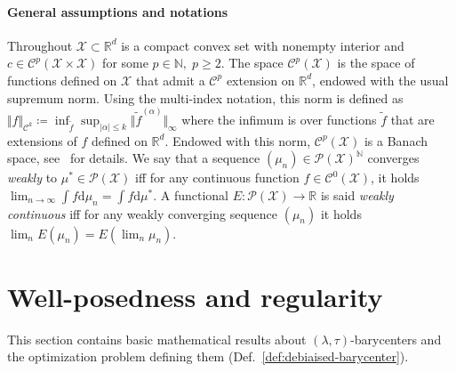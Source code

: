 \documentclass[11pt]{article}
\newcommand{\rev}[1]{{#1}}
\newcommand{\RR}{\mathbb{R}}
\newcommand{\NN}{\mathbb{N}}
\newcommand{\Cc}{\mathcal{C}}
\newcommand{\Pp}{\mathcal{P}}
\newcommand{\Xx}{\mathcal{X}}
\renewcommand{\d}{\mathrm{d}}
\begin{document}
\paragraph{\rev{General assumptions and notations}}
Throughout $\Xx \subset \RR^d$ is a compact convex set with nonempty interior and $c\in \Cc^p(\Xx\times \Xx)$ for some $p\in \NN,\; p\geq 2$. \rev{The space $\Cc^{p}(\Xx)$ is the space of functions defined on $\Xx$ that admit a $\Cc^p$ extension on $\RR^d$, endowed with the usual supremum norm. Using the multi-index notation, this norm is defined as
\(
\Vert f\Vert_{\Cc^k} \coloneqq \inf_{\tilde f}\sup_{\vert \alpha\vert \leq k} \Vert \tilde f^{(\alpha)}\Vert_\infty
\)
where the infimum is over functions $\tilde f$ that are extensions of $f$ defined on $\RR^d$. Endowed with this norm, $\Cc^p(\Xx)$ is a Banach space, see~\cite[Chap.~8, II]{queffelec2020analyse} for details. We say that a sequence $(\mu_n) \in\Pp(\Xx)^\NN$ converges \emph{weakly} to $\mu^*\in \Pp(\Xx)$ iff for any continuous function $f\in \Cc^0(\Xx)$, it holds $\lim_{n\to \infty} \int f\d\mu_n =\int f\d\mu^*$. A functional $E:\Pp(\Xx)\to \RR$ is said \emph{weakly continuous} iff for any weakly converging sequence $(\mu_n)$ it holds $\lim_n E(\mu_n)=E(\lim_n \mu_n)$.
}


\section{Well-posedness and regularity}\label{sec:statics}
This section contains basic mathematical results about $(\lambda,\tau)$-barycenters and the optimization problem defining them (Def.~\ref{def:debiaised-barycenter}). 
\end{document}
